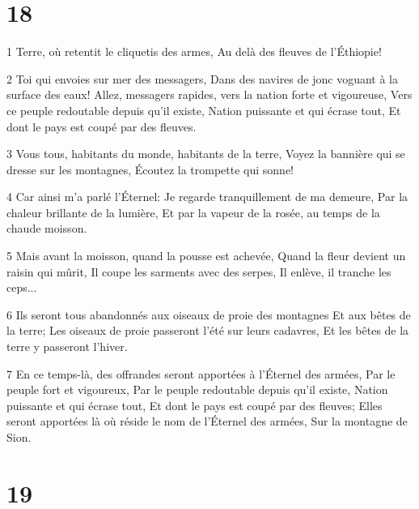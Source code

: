 \chapter{18}

\par 1 Terre, où retentit le cliquetis des armes, Au delà des fleuves de l'Éthiopie!
\par 2 Toi qui envoies sur mer des messagers, Dans des navires de jonc voguant à la surface des eaux! Allez, messagers rapides, vers la nation forte et vigoureuse, Vers ce peuple redoutable depuis qu'il existe, Nation puissante et qui écrase tout, Et dont le pays est coupé par des fleuves.
\par 3 Vous tous, habitants du monde, habitants de la terre, Voyez la bannière qui se dresse sur les montagnes, Écoutez la trompette qui sonne!
\par 4 Car ainsi m'a parlé l'Éternel: Je regarde tranquillement de ma demeure, Par la chaleur brillante de la lumière, Et par la vapeur de la rosée, au temps de la chaude moisson.
\par 5 Mais avant la moisson, quand la pousse est achevée, Quand la fleur devient un raisin qui mûrit, Il coupe les sarments avec des serpes, Il enlève, il tranche les ceps...
\par 6 Ils seront tous abandonnés aux oiseaux de proie des montagnes Et aux bêtes de la terre; Les oiseaux de proie passeront l'été sur leurs cadavres, Et les bêtes de la terre y passeront l'hiver.
\par 7 En ce temps-là, des offrandes seront apportées à l'Éternel des armées, Par le peuple fort et vigoureux, Par le peuple redoutable depuis qu'il existe, Nation puissante et qui écrase tout, Et dont le pays est coupé par des fleuves; Elles seront apportées là où réside le nom de l'Éternel des armées, Sur la montagne de Sion.

\chapter{19}

